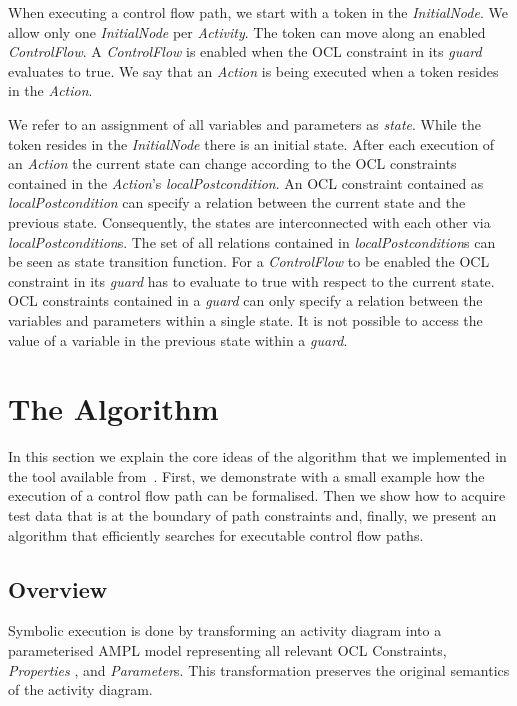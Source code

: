 \documentclass[runningheads,a4paper]{llncs}%
\newcommand{\UMLType}[1]{\textsf{\textit{#1}}} %
\newcommand{\UMLReference}[1]{\textsf{\textit{#1}}} %
\begin{document}
When executing a control flow path, we start with a token in the
\UMLType{InitialNode}. We allow only one \UMLType{InitialNode} per
\UMLType{Activity}. The token can move along an enabled \UMLType{ControlFlow}. A
\UMLType{ControlFlow} is enabled when the OCL constraint in its
\UMLReference{guard} evaluates to true. We say that an \UMLType{Action} is being
executed when a token resides in the \UMLType{Action}.

We refer to an assignment of all variables and parameters as \emph{state}. While
the token resides in the \UMLType{InitialNode} there is an initial state. After
each execution of an \UMLType{Action} the current state can change according to
the OCL constraints contained in the \UMLType{Action}'s
\UMLReference{localPostcondition}. An OCL constraint contained as
\UMLType{localPostcondition} can specify a relation between the current state
and the previous state. Consequently, the states are interconnected with each
other via \UMLReference{localPostcondition}s. The set of all relations contained
in \UMLType{localPostcondition}s can be seen as state transition function. For a
\UMLType{ControlFlow} to be enabled the OCL constraint in its
\UMLReference{guard} has to evaluate to true with respect to the current state.
OCL constraints contained in a \UMLReference{guard} can only specify a relation
between the variables and parameters within a single state. It is not possible
to access the value of a variable in the previous state within a
\UMLReference{guard}.
\section{The Algorithm}%
\label{sec:Algorithm}%
In this section we explain the core ideas of the algorithm that we implemented
in the tool available from~\cite{PartegWebsite}. First, we demonstrate with a
small example how the execution of a control flow path can be formalised. Then
we show how to acquire test data that is at the boundary of path constraints
and, finally, we present an algorithm that efficiently searches for executable
control flow paths.%
\subsection{Overview}%
Symbolic execution is done by transforming an activity diagram into a
parameterised AMPL model representing all relevant OCL Constraints,
\UMLType{Properties} , and \UMLType{Parameter}s. This transformation preserves
the original semantics of the activity diagram.
\end{document}
